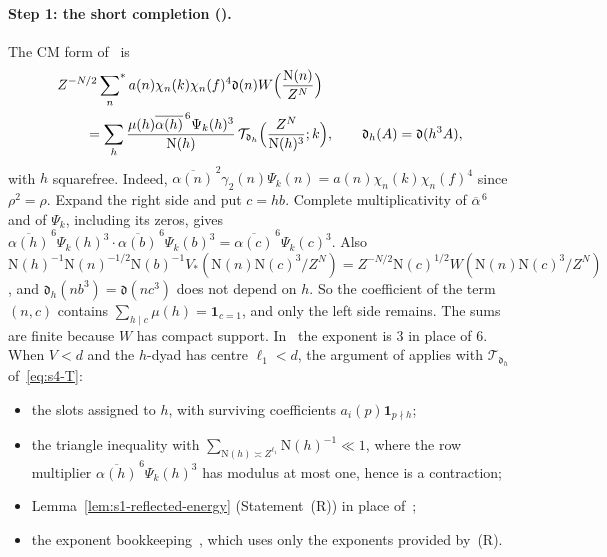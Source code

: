 \documentclass[11pt]{article}
\numberwithin{equation}{section}
\newcommand{\N}{\mathrm N}
\newcommand{\ind}{\mathbf1}
\newcommand{\ssum}{\sideset{}{^*}\sum}
\begin{document}
\paragraph{Step 1: the short completion (\cite[proof of Lemma~17.2, \emph{The short completion}]{OAI78}).} The CM form of~\cite[eq.~(17.10)]{OAI78} is
\begin{equation}\label{eq:s4-inversion}
\begin{split}
 &Z^{-N/2}\ssum_n a(n)\chi_n(k)\chi_n(f)^4\mathfrak d(n)W\Bigl(\frac{\N(n)}{Z^N}\Bigr)\\
 &\qquad=\sum_h\frac{\mu(h)\overline{\alpha(h)}^{\,6}\Psi_k(h)^3}{\N(h)}\,
 \mathcal T_{\mathfrak d_h}\Bigl(\frac{Z^N}{\N(h)^3};k\Bigr),\qquad \mathfrak d_h(A)=\mathfrak d(h^3A),
\end{split}
\end{equation}
with $h$ squarefree. Indeed, $\overline{\alpha(n)}^{\,2}\gamma_2(n)\Psi_k(n)=a(n)\chi_n(k)\chi_n(f)^4$ since $\rho^2=\rho$.
Expand the right side and put $c=hb$. Complete multiplicativity of $\overline\alpha^{\,6}$ and of $\Psi_k$, including
its zeros, gives $\overline{\alpha(h)}^{\,6}\Psi_k(h)^3\cdot\overline{\alpha(b)}^{\,6}\Psi_k(b)^3=\overline{\alpha(c)}^{\,6}\Psi_k(c)^3$.
Also $\N(h)^{-1}\N(n)^{-1/2}\N(b)^{-1}V_*(\N(n)\N(c)^3/Z^N)=Z^{-N/2}\N(c)^{1/2}W(\N(n)\N(c)^3/Z^N)$, and
$\mathfrak d_h(nb^3)=\mathfrak d(nc^3)$ does not depend on $h$. So the coefficient of the term $(n,c)$ contains
$\sum_{h\mid c}\mu(h)=\ind_{c=1}$, and only the left side remains. The sums are finite because $W$ has compact
support. In~\cite{OAI78} the exponent is $3$ in place of $6$. When $V<d$ and the $h$-dyad has centre $\ell_1<d$,
the argument of \cite[proof of Lemma~17.2, \emph{The short completion}]{OAI78} applies with $\mathcal T_{\mathfrak d_h}$ of~\eqref{eq:s4-T}:
\begin{itemize}
\item the slots assigned to $h$, with surviving coefficients $a_i(p)\ind_{p\nmid h}$;
\item the triangle inequality with $\sum_{\N(h)\asymp Z^{\ell_1}}\N(h)^{-1}\ll1$, where the row
 multiplier $\overline{\alpha(h)}^{\,6}\Psi_k(h)^3$ has modulus at most one, hence is a contraction;
\item Lemma~\ref{lem:s1-reflected-energy} (Statement~(R)) in place of~\cite[Lemma~14.3]{OAI78};
\item the exponent bookkeeping~\cite[eq.~(17.11), (17.12)--(17.14)]{OAI78}, which uses only
 the exponents provided by~(R).
\end{itemize}
\end{document}
